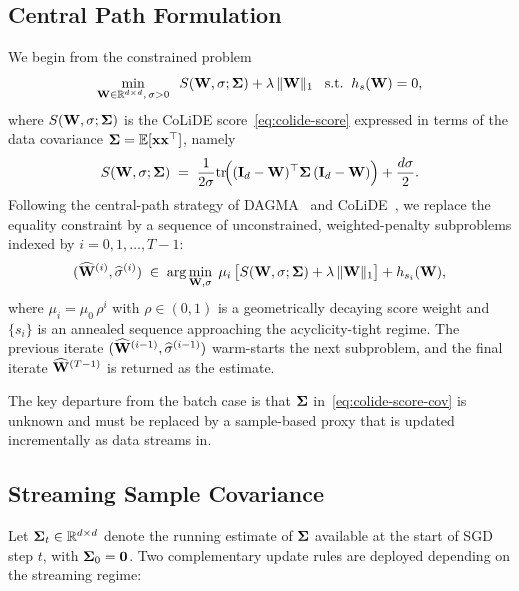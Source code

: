 \documentclass[journal,twoside]{IEEEtran}
\begin{document}
\subsection{Central Path Formulation}
\label{sec:al-form}
We begin from the constrained problem
\begin{equation}
\label{eq:sem-constrained}
\min_{{\mathbf W} \in \mathbb{R}^{d \times d},\, \sigma > 0}
\;\; S({\mathbf W}, \sigma; \boldsymbol{\Sigma}) + \lambda\,\|{\mathbf W}\|_1
\;\;\; \mathrm{s.t.} \;\; h_s({\mathbf W}) = 0,
\end{equation}
where $S({\mathbf W}, \sigma; \boldsymbol{\Sigma})$ is the CoLiDE
score~\eqref{eq:colide-score} expressed in terms of the data covariance
$\boldsymbol{\Sigma} = \mathbb{E}[{\mathbf x}{\mathbf x}^\top]$, namely
\begin{equation}
\label{eq:colide-score-cov}
S({\mathbf W}, \sigma; \boldsymbol{\Sigma})
\;=\; \frac{1}{2\sigma}
\mathrm{tr}\!\Big( ({\mathbf I}_d - {\mathbf W})^\top \boldsymbol{\Sigma}\, ({\mathbf I}_d - {\mathbf W}) \Big)
+ \frac{d\sigma}{2}.
\end{equation}
Following the central-path strategy of DAGMA~\cite{bello2022dagma} and
CoLiDE~\cite{saboksayr2023colide}, we replace the equality constraint by
a sequence of unconstrained, weighted-penalty subproblems indexed by
$i = 0, 1, \ldots, T-1$:
\begin{equation}
\label{eq:al-subprob}
(\widehat{{\mathbf W}}^{(i)}, \widehat{\sigma}^{(i)})
\;\in\;
\arg\min_{{\mathbf W}, \sigma}
\; \mu_i\,\big[ S({\mathbf W}, \sigma; \boldsymbol{\Sigma})
+ \lambda\,\|{\mathbf W}\|_1 \big]
+ h_{s_i}({\mathbf W}),
\end{equation}
where $\mu_i = \mu_0\,\rho^i$ with $\rho \in (0,1)$ is a geometrically
decaying score weight and $\{s_i\}$ is an annealed sequence approaching
the acyclicity-tight regime. The previous iterate
$(\widehat{{\mathbf W}}^{(i-1)}, \widehat{\sigma}^{(i-1)})$ warm-starts the
next subproblem, and the final iterate $\widehat{{\mathbf W}}^{(T-1)}$ is
returned as the estimate.

The key departure from the batch case is that $\boldsymbol{\Sigma}$
in~\eqref{eq:colide-score-cov} is unknown and must be replaced by a
sample-based proxy that is updated incrementally as data streams in.

\subsection{Streaming Sample Covariance}
\label{sec:online-cov}
Let $\boldsymbol{\Sigma}_t \in \mathbb{R}^{d \times d}$ denote the running
estimate of $\boldsymbol{\Sigma}$ available at the start of SGD step $t$, with
$\boldsymbol{\Sigma}_0 = {\mathbf 0}$. Two complementary update rules are deployed
depending on the streaming regime:
\end{document}
